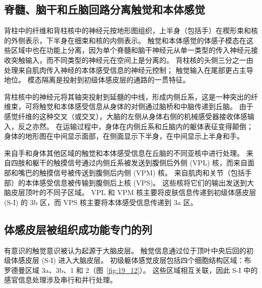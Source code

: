 \subsection{脊髓、脑干和丘脑回路分离触觉和本体感觉}

背柱中的纤维和背柱核中的神经元按地形图组织，上半身（包括手）在楔形束和核的外侧表示，下半身在细束和核的内侧表示。
触觉和本体感觉的体感子模态在这些区域中也在功能上分离，因为单个脊髓和脑干神经元从单一类型的传入神经元接收突触输入，而不同类型的神经元在空间上是分离的。 
背柱核的头侧三分之一由处理来自肌肉传入神经的本体感受信息的神经元控制； 触觉输入在尾部更占主导地位。
模态隔离是投射到初级体感皮层的通路的一贯特征。


背柱核中的神经元将其轴突投射到延髓的中线，形成内侧丘系，这是一种突出的纤维束，可将触觉和本体感受信息从身体的对侧通过脑桥和中脑传递到丘脑。
由于感觉纤维的这种交叉（或交叉），大脑的左侧从身体右侧的机械感受器接收体感输入，反之亦然。
在运输过程中，身体在内侧丘系和丘脑内的躯体表征变得颠倒；
身体的地形图在中间显示面部，在侧面显示下半身，在中间显示上半身和手。


来自手和身体其他区域的触觉和本体感受信息在丘脑的不同亚核中进行处理。
来自四肢和躯干的触摸信号通过内侧丘系被发送到腹侧后外侧 (VPL) 核，而来自面部和嘴巴的触摸信号被传送到腹侧后内侧 (VPM) 核。
来自肌肉和关节（包括手部）的本体感受信息被传输到腹侧后上核 (VPS)。
这些核将它们的输出发送到大脑皮层顶叶的不同子区域。 
VPL 和 VPM 核主要将皮肤信息传递到初级体感皮层 (S-I) 的 3b 区，而 VPS 核主要将本体感受信息传递到 3a 区。



\subsection{体感皮层被组织成功能专门的列}

有意识的触觉意识被认为起源于大脑皮层。
触觉信息通过位于顶叶中央后回的初级体感皮层 (S-I) 进入大脑皮层。
初级躯体感觉皮层包括四个细胞结构区域：布罗德曼区域 3a、3b、1 和 2（图~\ref{fig:19_12}）。
这些区域相互关联，因此 S-I 中的感官信息处理涉及串行和并行处理。



